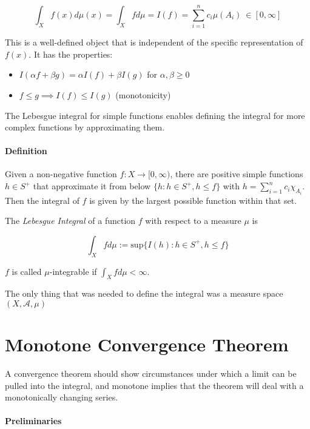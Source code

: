 \begin{equation}
\int_X f(x) d\mu(x) = \int_X f d\mu = I(f) = \sum_{i=1}^n c_i \mu(A_i)\ \in [0,\infty]
\end{equation}

This is a well-defined object that is independent of the specific representation of $f(x)$. It has the properties:

\begin{itemize}
\item $I(\alpha f + \beta g) = \alpha I(f) + \beta I(g)$ for $\alpha,\beta \geq 0$
\item $f \leq g \implies I(f) \leq I(g)$ (monotonicity)
\end{itemize}

The Lebesgue integral for simple functions enables defining the integral for more complex functions by approximating them.

\paragraph{Definition} 
Given a non-negative function $f:X \rightarrow [0,\infty)$, there are positive simple functions $h\in S^+$ that approximate it from below $\{h: h\in S^+, h\leq f\}$ with $h=\sum_{i=1}^n c_i \chi_{A_i}$. Then the integral of $f$ is given by the largest possible function within that set.

The \textit{Lebesgue Integral} of a function $f$ with respect to a measure $\mu$ is

\begin{equation}
\int_X f d\mu := \mathrm{sup}\{ I(h) : h\in S^+, h\leq f \}
\end{equation}

$f$ is called $\mu$-integrable if $\int_X f d\mu < \infty$.

The only thing that was needed to define the integral was a measure space $(X,\mathscr{A},\mu)$



\section{Monotone Convergence Theorem}

A convergence theorem should show circumstances under which a limit can be pulled into the integral, and monotone implies that the theorem will deal with a monotonically changing series.

\paragraph{Preliminaries}

